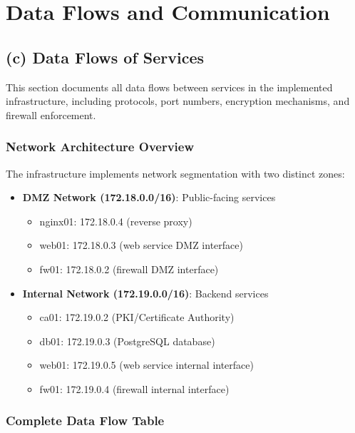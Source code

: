 
\chapter{Data Flows and Communication}

\section{(c) Data Flows of Services}

This section documents all data flows between services in the implemented infrastructure, including protocols, port numbers, encryption mechanisms, and firewall enforcement.

\subsection{Network Architecture Overview}

The infrastructure implements network segmentation with two distinct zones:

\begin{itemize}
    \item \textbf{DMZ Network (172.18.0.0/16)}: Public-facing services
    \begin{itemize}
        \item nginx01: 172.18.0.4 (reverse proxy)
        \item web01: 172.18.0.3 (web service DMZ interface)
        \item fw01: 172.18.0.2 (firewall DMZ interface)
    \end{itemize}
    \item \textbf{Internal Network (172.19.0.0/16)}: Backend services
    \begin{itemize}
        \item ca01: 172.19.0.2 (PKI/Certificate Authority)
        \item db01: 172.19.0.3 (PostgreSQL database)
        \item web01: 172.19.0.5 (web service internal interface)
        \item fw01: 172.19.0.4 (firewall internal interface)
    \end{itemize}
\end{itemize}

\subsection{Complete Data Flow Table}

